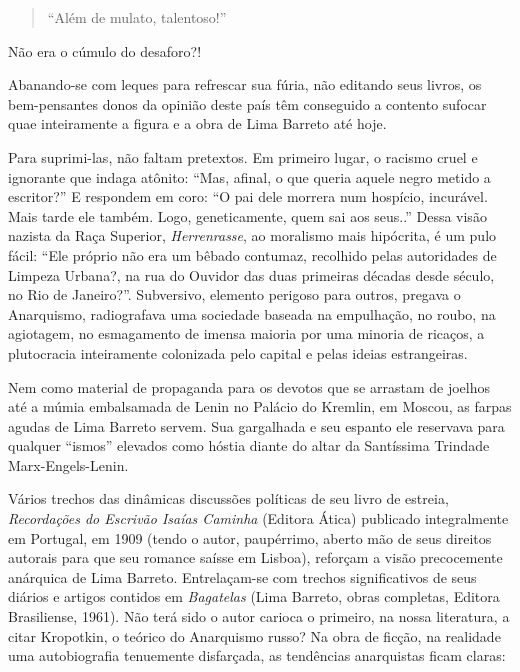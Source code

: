 \documentclass[
  letterpaper,
  DIV=11,
  numbers=noendperiod]{scrreprt}
\begin{document}
\begin{quote}
``Além de mulato, talentoso!''
\end{quote}

Não era o cúmulo do desaforo?!

Abanando-se com leques para refrescar sua fúria, não editando seus
livros, os bem-pensantes donos da opinião deste país têm conseguido a
contento sufocar quae inteiramente a figura e a obra de Lima Barreto até
hoje.

Para suprimi-las, não faltam pretextos. Em primeiro lugar, o racismo
cruel e ignorante que indaga atônito: ``Mas, afinal, o que queria aquele
negro metido a escritor?'' E respondem em coro: ``O pai dele morrera num
hospício, incurável. Mais tarde ele também. Logo, geneticamente, quem
sai aos seus..'' Dessa visão nazista da Raça Superior,
\emph{Herrenrasse}, ao moralismo mais hipócrita, é um pulo fácil: ``Ele
próprio não era um bêbado contumaz, recolhido pelas autoridades de
Limpeza Urbana?, na rua do Ouvidor das duas primeiras décadas desde
século, no Rio de Janeiro?''. Subversivo, elemento perigoso para outros,
pregava o Anarquismo, radiografava uma sociedade baseada na empulhação,
no roubo, na agiotagem, no esmagamento de imensa maioria por uma minoria
de ricaços, a plutocracia inteiramente colonizada pelo capital e pelas
ideias estrangeiras.

Nem como material de propaganda para os devotos que se arrastam de
joelhos até a múmia embalsamada de Lenin no Palácio do Kremlin, em
Moscou, as farpas agudas de Lima Barreto servem. Sua gargalhada e seu
espanto ele reservava para qualquer ``ismos'' elevados como hóstia
diante do altar da Santíssima Trindade Marx-Engels-Lenin.

Vários trechos das dinâmicas discussões políticas de seu livro de
estreia, \emph{Recordações do Escrivão Isaías Caminha} (Editora Ática)
publicado integralmente em Portugal, em 1909 (tendo o autor, paupérrimo,
aberto mão de seus direitos autorais para que seu romance saísse em
Lisboa), reforçam a visão precocemente anárquica de Lima Barreto.
Entrelaçam-se com trechos significativos de seus diários e artigos
contidos em \emph{Bagatelas} (Lima Barreto, obras completas, Editora
Brasiliense, 1961). Não terá sido o autor carioca o primeiro, na nossa
literatura, a citar Kropotkin, o teórico do Anarquismo russo? Na obra de
ficção, na realidade uma autobiografia tenuemente disfarçada, as
tendências anarquistas ficam claras:
\end{document}
